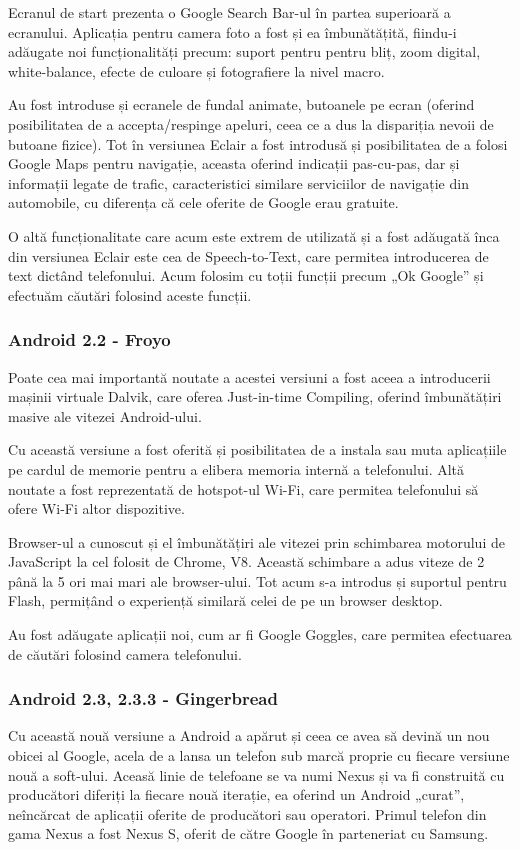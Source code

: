 \documentclass[12pt,a4paper]{article}
\begin{document}
	Ecranul de start prezenta o Google Search Bar-ul în partea superioară a ecranului. Aplicația pentru camera foto a fost și ea îmbunătățită, fiindu-i adăugate noi funcționalități precum: suport pentru pentru bliț, zoom digital, white-balance, efecte de culoare și fotografiere la nivel macro.

	Au fost introduse și ecranele de fundal animate, butoanele pe ecran (oferind posibilitatea de a accepta/respinge apeluri, ceea ce a dus la dispariția nevoii de butoane fizice). Tot în versiunea Eclair a fost introdusă și posibilitatea de a folosi Google Maps pentru navigație, aceasta oferind indicații pas-cu-pas, dar și informații legate de trafic, caracteristici similare serviciilor de navigație din automobile, cu diferența că cele oferite de Google erau gratuite.

	O altă funcționalitate care acum este extrem de utilizată și a fost adăugată înca din versiunea Eclair este cea de Speech-to-Text, care permitea introducerea de text dictând telefonului. Acum folosim cu toții funcții precum „Ok Google” și efectuăm căutări folosind aceste funcții.
	

\subsubsection{Android 2.2 - Froyo}
Poate cea mai importantă noutate a acestei versiuni a fost aceea a introducerii mașinii virtuale Dalvik, care oferea Just-in-time Compiling, oferind îmbunătățiri masive ale vitezei Android-ului.

	Cu această versiune a fost oferită și posibilitatea de a instala sau muta aplicațiile pe cardul de memorie pentru a elibera memoria internă a telefonului. Altă noutate a fost reprezentată de hotspot-ul Wi-Fi, care permitea telefonului să ofere Wi-Fi altor dispozitive.

	Browser-ul a cunoscut și el îmbunătățiri ale vitezei prin schimbarea motorului de JavaScript la cel folosit de Chrome, V8. Această schimbare a adus viteze de 2 până la 5 ori mai mari ale browser-ului. Tot acum s-a introdus și suportul pentru Flash, permițând o experiență similară celei de pe un browser desktop.

	Au fost adăugate aplicații noi, cum ar fi Google Goggles, care permitea efectuarea de căutări folosind camera telefonului.


\subsubsection{Android 2.3, 2.3.3 - Gingerbread}
Cu această nouă versiune a Android a apărut și ceea ce avea să devină un nou obicei al Google, acela de a lansa un telefon sub marcă proprie cu fiecare versiune nouă a soft-ului. Aceasă linie de telefoane se va numi Nexus și va fi construită cu producători diferiți la fiecare nouă iterație, ea oferind un Android „curat”, neîncărcat de aplicații oferite de producători sau operatori. Primul telefon din gama Nexus a fost Nexus S, oferit de către Google în parteneriat cu Samsung.
\end{document}
